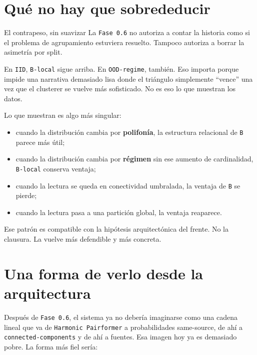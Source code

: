 \documentclass[11pt]{article}
\begin{document}
\section{Qué no hay que sobrededucir}

\begin{alertbox}{El contrapeso, sin suavizar}
La \texttt{Fase 0.6} no autoriza a contar la historia como si el problema de agrupamiento estuviera resuelto. Tampoco autoriza a borrar la asimetría por split.

En \texttt{IID}, \texttt{B-local} sigue arriba. En \texttt{OOD-regime}, también. Eso importa porque impide una narrativa demasiado lisa donde el triángulo simplemente ``vence'' una vez que el clusterer se vuelve más sofisticado. No es eso lo que muestran los datos.
\end{alertbox}

Lo que muestran es algo más singular:

\begin{itemize}
  \item cuando la distribución cambia por \textbf{polifonía}, la estructura relacional de \texttt{B} parece más útil;
  \item cuando la distribución cambia por \textbf{régimen} sin ese aumento de cardinalidad, \texttt{B-local} conserva ventaja;
  \item cuando la lectura se queda en conectividad umbralada, la ventaja de \texttt{B} se pierde;
  \item cuando la lectura pasa a una partición global, la ventaja reaparece.
\end{itemize}

Ese patrón es compatible con la hipótesis arquitectónica del frente. No la clausura. La vuelve más defendible y más concreta.

\section{Una forma de verlo desde la arquitectura}

Después de \texttt{Fase 0.6}, el sistema ya no debería imaginarse como una cadena lineal que va de \texttt{Harmonic Pairformer} a probabilidades \textsf{same-source}, de ahí a \texttt{connected-components} y de ahí a fuentes. Esa imagen hoy ya es demasiado pobre. La forma más fiel sería:
\end{document}
